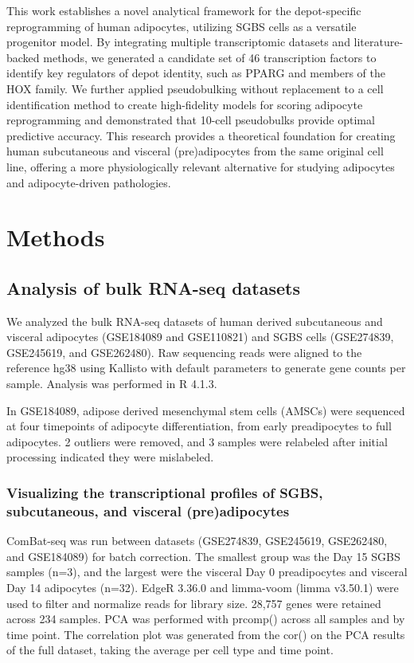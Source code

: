 This work establishes a novel analytical framework for the depot-specific reprogramming of human adipocytes, utilizing SGBS cells as a versatile progenitor model. By integrating multiple transcriptomic datasets and literature-backed methods, we generated a candidate set of 46 transcription factors to identify key regulators of depot identity, such as PPARG and members of the HOX family. We further applied pseudobulking without replacement to a cell identification method to create high-fidelity models for scoring adipocyte reprogramming and demonstrated that 10-cell pseudobulks provide optimal predictive accuracy. This research provides a theoretical foundation for creating human subcutaneous and visceral (pre)adipocytes from the same original cell line, offering a more physiologically relevant alternative for studying adipocytes and adipocyte-driven pathologies.

\section{Methods}

\subsection{Analysis of bulk RNA-seq datasets}

We analyzed the bulk RNA-seq datasets of human derived subcutaneous and visceral adipocytes (GSE184089 and GSE110821) and SGBS cells (GSE274839, GSE245619, and GSE262480). Raw sequencing reads were aligned to the reference hg38 using Kallisto with default parameters\cite{Bray2016-zt} to generate gene counts per sample. Analysis was performed in R 4.1.3.   

In GSE184089, adipose derived mesenchymal stem cells (AMSCs) were sequenced at four timepoints of adipocyte differentiation, from early preadipocytes to full adipocytes. 2 outliers were removed, and 3 samples were relabeled after initial processing indicated they were mislabeled.

\subsubsection{Visualizing the transcriptional profiles of SGBS, subcutaneous, and visceral (pre)adipocytes}
ComBat-seq was run between datasets (GSE274839, GSE245619, GSE262480, and GSE184089) for batch correction\cite{Zhang2020-kq}. The smallest group was the Day 15 SGBS samples (n=3), and the largest were the visceral Day 0 preadipocytes and visceral Day 14 adipocytes (n=32). EdgeR 3.36.0 and limma-voom (limma v3.50.1) were used to filter and normalize reads for library size\cite{Robinson2010-qx,Law2014-yh}. 28,757 genes were retained across 234 samples. PCA was performed with prcomp() across all samples and by time point. The correlation plot was generated from the cor() on the PCA results of the full dataset, taking the average per cell type and time point. 

